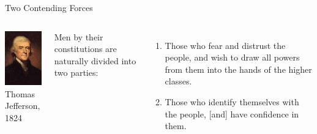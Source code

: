 \begin{frame}{Two Contending Forces}
    \begin{columns}[onlytextwidth]
            \centering
            \includegraphics[height=0.75\textheight]{img/jefferson.png} \\
            Thomas Jefferson, 1824

            Men by their constitutions are naturally divided into two parties: \\
            \begin{enumerate}
                \item Those who fear and distrust the people, and wish to draw all powers from them into the hands of the higher classes.
                \item Those who identify themselves with the people, [and] have confidence in them.
            \end{enumerate}
    \end{columns}
\end{frame}

